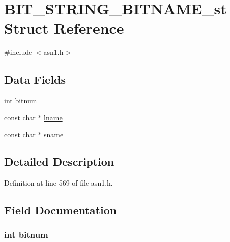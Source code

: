 \hypertarget{struct_b_i_t___s_t_r_i_n_g___b_i_t_n_a_m_e__st}{}\section{B\+I\+T\+\_\+\+S\+T\+R\+I\+N\+G\+\_\+\+B\+I\+T\+N\+A\+M\+E\+\_\+st Struct Reference}
\label{struct_b_i_t___s_t_r_i_n_g___b_i_t_n_a_m_e__st}


{\ttfamily \#include $<$asn1.\+h$>$}

\subsection*{Data Fields}
\begin{DoxyCompactItemize}
\item 
int \hyperlink{struct_b_i_t___s_t_r_i_n_g___b_i_t_n_a_m_e__st_a903e7bb8f8212bcd8e01d86b505192c8}{bitnum}
\item 
const char $\ast$ \hyperlink{struct_b_i_t___s_t_r_i_n_g___b_i_t_n_a_m_e__st_a988203a1d0328d0bf5b4a4f06b492674}{lname}
\item 
const char $\ast$ \hyperlink{struct_b_i_t___s_t_r_i_n_g___b_i_t_n_a_m_e__st_a4b80c486312c118a491cc0d75a52d6e0}{sname}
\end{DoxyCompactItemize}


\subsection{Detailed Description}


Definition at line 569 of file asn1.\+h.



\subsection{Field Documentation}
\subsubsection[{\texorpdfstring{bitnum}{bitnum}}]{\setlength{\rightskip}{0pt plus 5cm}int bitnum}\hypertarget{struct_b_i_t___s_t_r_i_n_g___b_i_t_n_a_m_e__st_a903e7bb8f8212bcd8e01d86b505192c8}{}\label{struct_b_i_t___s_t_r_i_n_g___b_i_t_n_a_m_e__st_a903e7bb8f8212bcd8e01d86b505192c8}


